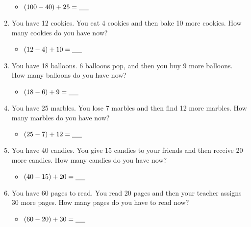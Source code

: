 \begin{enumerate}
    \begin{itemize}
        \item $(100 - 40) + 25 = \underline{\hspace{0.5cm}}$
    \end{itemize}
    \item You have 12 cookies. You eat 4 cookies and then bake 10 more cookies. How many cookies do you have now?
    \begin{itemize}
        \item $(12 - 4) + 10 = \underline{\hspace{0.5cm}}$
    \end{itemize}
    \item You have 18 balloons. 6 balloons pop, and then you buy 9 more balloons. How many balloons do you have now?
    \begin{itemize}
        \item $(18 - 6) + 9 = \underline{\hspace{0.5cm}}$
    \end{itemize}
    \item You have 25 marbles. You lose 7 marbles and then find 12 more marbles. How many marbles do you have now?
    \begin{itemize}
        \item $(25 - 7) + 12 = \underline{\hspace{0.5cm}}$
    \end{itemize}
    \item You have 40 candies. You give 15 candies to your friends and then receive 20 more candies. How many candies do you have now?
    \begin{itemize}
        \item $(40 - 15) + 20 = \underline{\hspace{0.5cm}}$
    \end{itemize}
    \item You have 60 pages to read. You read 20 pages and then your teacher assigns 30 more pages. How many pages do you have to read now?
    \begin{itemize}
        \item $(60 - 20) + 30 = \underline{\hspace{0.5cm}}$
    \end{itemize}
\end{enumerate}

